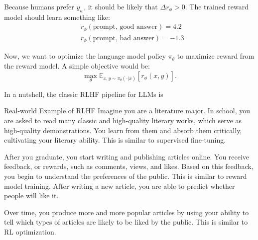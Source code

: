 Because humans prefer \(y_w\), it should be likely that \(\Delta r_\phi > 0\). The trained reward model should learn something like:
\begin{align*}
	 & r_\phi(\text{prompt, good answer}) = 4.2 \\
	 & r_\phi(\text{prompt, bad answer}) = -1.3
\end{align*}

Now, we want to optimize the language model policy \(\pi_\theta\) to maximize reward from the reward model. A simple objective would be:
\[
	\max_{\theta} \mathbb{E}_{x, y \sim \pi_\theta(\cdot | x) } \left[ r_\phi(x, y) \right].
\]

In a nutshell, the classic RLHF pipeline for LLMs is
\OrderListBegin
{}
\OrderListEnd

\vspace{1em}
\begin{NoteBox}{Real-world Example of RLHF}
	Imagine you are a literature major. In school, you are asked to read many classic and high-quality literary works, which serve as high-quality demonstrations. You learn from them and absorb them critically, cultivating your literary ability. This is similar to supervised fine-tuning.
	\medskip

	After you graduate, you start writing and publishing articles online. You receive feedback, or rewards, such as comments, views, and likes. Based on this feedback, you begin to understand the preferences of the public. This is similar to reward model training. After writing a new article, you are able to predict whether people will like it.
	\medskip

	Over time, you produce more and more popular articles by using your ability to tell which types of articles are likely to be liked by the public. This is similar to RL optimization.
\end{NoteBox}
